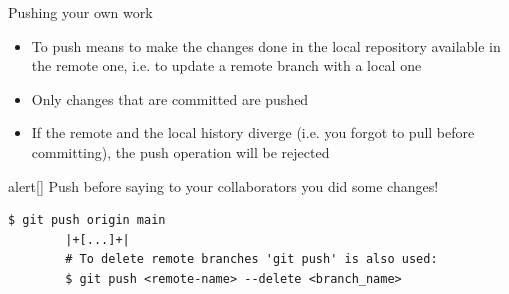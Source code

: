 \documentclass[usenames,svgnames,14pt]{beamer}
\begin{document}
\begin{frame}[fragile]{Pushing your own work}
    \vspace{-3mm}
    \begin{itemize}
        \item To push means to make the changes done in the local repository available in the remote one, i.e. to update a remote branch with a local one
        \item Only changes that are committed are pushed
        \item If the remote and the local history diverge (i.e. you forgot to pull before committing), the push operation will be rejected
    \end{itemize}
    \begin{varblock}{alert}[\textwidth]{}
        \alert{Push before saying to your collaborators you did some changes!}
    \end{varblock}
    \begin{lstlisting}[style=MyBash]
        $ git push origin main
        |+[...]+|
        # To delete remote branches 'git push' is also used:
        $ git push <remote-name> --delete <branch_name>
    \end{lstlisting}
\end{frame}
\end{document}
